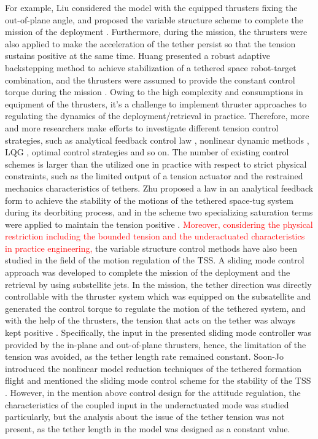 \documentclass[3p]{elsarticle}
\theoremstyle{plain}
\begin{document}
For example, Liu considered the model with the equipped thrusters fixing the out-of-plane angle, and proposed the variable structure scheme to complete the mission of the deployment \cite{yingying2012variable}. Furthermore, during the mission, the thrusters were also applied to make the acceleration of the tether persist so that the tension sustains positive at the same time. Huang presented a robust adaptive backstepping method to achieve stabilization of a tethered space robot-target combination, and the thrusters were assumed to provide the constant control torque during the mission \cite{huang2015adaptive}. Owing to the high complexity and consumptions in equipment of the thrusters, it's a challenge to implement thruster approaches to regulating the dynamics of the deployment/retrieval in practice. Therefore, more and more researchers make efforts to investigate different tension control strategies, such as analytical feedback control law \cite{wen2015space}, nonlinear dynamic methods \cite{jung2015nonlinear}, LQG \cite{yousefian2015anti}, optimal control strategies \cite{steindl2015optimal,Williams2009745} and so on. The number of existing control schemes is larger than the utilized one in practice with respect to strict physical constraints, such as the limited output of a tension actuator and the restrained mechanics characteristics of tethers. Zhu proposed a law in an analytical feedback form to achieve the stability of the motions of the tethered space-tug system during its deorbiting process, and in the scheme two specializing saturation terms were applied to maintain the tension positive \cite{wen2016constrained}. \textcolor{red}{Moreover, considering the physical restriction including the bounded tension and the underactuated characteristics in practice engineering,} the variable structure control methods have also been studied in the field of the motion regulation of the TSS. A sliding mode control approach was developed to complete the mission of the deployment and the retrieval by using substellite jets. In the mission, the tether direction was directly controllable with the thruster system which was equipped on the subsatellite and generated the control torque to regulate the motion of the tethered system, and with the help of the thrusters, the tension that acts on the tether was always kept positive \cite{yingying2012variable}.
Specifically, the input in the presented sliding mode controller was provided by the in-plane and out-of-plane thrusters, hence, the limitation of the tension was avoided, as the tether length rate remained constant. Soon-Jo introduced the nonlinear model reduction techniques of the tethered formation flight and mentioned the sliding mode control scheme for the stability of the TSS \cite{chung2007nonlinear,chung2008propellant2}. However, in the mention above control design for the attitude regulation, the characteristics of the coupled input in the underactuated mode was studied particularly, but the analysis about the issue of the tether tension was not present, as the tether length in the model was designed as a constant value.\par
\end{document}
